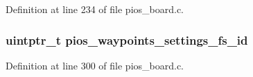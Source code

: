 Definition at line 234 of file pios\-\_\-board.\-c.

\hypertarget{group___open_pilot_core_ga4b04979e5fb31eaa66088178605835cd}{
\subsubsection[{pios\-\_\-waypoints\-\_\-settings\-\_\-fs\-\_\-id}]{\setlength{\rightskip}{0pt plus 5cm}uintptr\-\_\-t pios\-\_\-waypoints\-\_\-settings\-\_\-fs\-\_\-id}}\label{group___open_pilot_core_ga4b04979e5fb31eaa66088178605835cd}


Definition at line 300 of file pios\-\_\-board.\-c.

